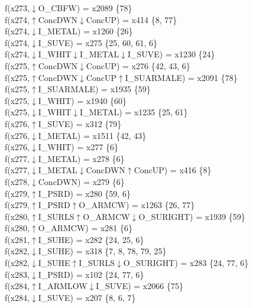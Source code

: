 f(x273,$\downarrow$O\_CBFW) = x2089 \{78\} \\  
f(x274,$\uparrow$ConcDWN$\downarrow$ConcUP) = x414 \{8, 77\} \\  
f(x274,$\downarrow$I\_METAL) = x1260 \{26\} \\  
f(x274,$\downarrow$I\_SUVE) = x275 \{25, 60, 61, 6\} \\  
f(x274,$\downarrow$I\_WHIT$\downarrow$I\_METAL$\downarrow$I\_SUVE) = x1230 \{24\} \\  
f(x275,$\uparrow$ConcDWN$\downarrow$ConcUP) = x276 \{42, 43, 6\} \\  
f(x275,$\uparrow$ConcDWN$\downarrow$ConcUP$\uparrow$I\_SUARMALE) = x2091 \{78\} \\  
f(x275,$\uparrow$I\_SUARMALE) = x1935 \{59\} \\  
f(x275,$\downarrow$I\_WHIT) = x1940 \{60\} \\  
f(x275,$\downarrow$I\_WHIT$\downarrow$I\_METAL) = x1235 \{25, 61\} \\  
f(x276,$\uparrow$I\_SUVE) = x312 \{79\} \\  
f(x276,$\downarrow$I\_METAL) = x1511 \{42, 43\} \\  
f(x276,$\downarrow$I\_WHIT) = x277 \{6\} \\  
f(x277,$\downarrow$I\_METAL) = x278 \{6\} \\  
f(x277,$\downarrow$I\_METAL$\downarrow$ConcDWN$\uparrow$ConcUP) = x416 \{8\} \\  
f(x278,$\downarrow$ConcDWN) = x279 \{6\} \\  
f(x279,$\uparrow$I\_PSRD) = x280 \{59, 6\} \\  
f(x279,$\uparrow$I\_PSRD$\uparrow$O\_ARMCW) = x1263 \{26, 77\} \\  
f(x280,$\uparrow$I\_SURLS$\uparrow$O\_ARMCW$\downarrow$O\_SURIGHT) = x1939 \{59\} \\  
f(x280,$\uparrow$O\_ARMCW) = x281 \{6\} \\  
f(x281,$\uparrow$I\_SUHE) = x282 \{24, 25, 6\} \\  
f(x282,$\downarrow$I\_SUHE) = x318 \{7, 8, 78, 79, 25\} \\  
f(x282,$\downarrow$I\_SUHE$\uparrow$I\_SURLS$\downarrow$O\_SURIGHT) = x283 \{24, 77, 6\} \\  
f(x283,$\downarrow$I\_PSRD) = x102 \{24, 77, 6\} \\  
f(x284,$\uparrow$I\_ARMLOW$\downarrow$I\_SUVE) = x2066 \{75\} \\  
f(x284,$\downarrow$I\_SUVE) = x207 \{8, 6, 7\} \\  
